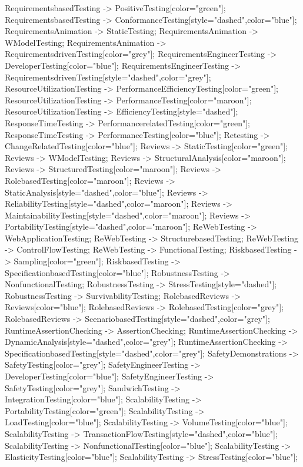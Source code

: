 \documentclass{article}
\begin{document}
{RequirementsbasedTesting -> PositiveTesting[color="green"];
RequirementsbasedTesting -> ConformanceTesting[style="dashed",color="blue"];
RequirementsAnimation -> StaticTesting;
RequirementsAnimation -> WModelTesting;
RequirementsAnimation -> RequirementsdrivenTesting[color="grey"];
RequirementsEngineerTesting -> DeveloperTesting[color="blue"];
RequirementsEngineerTesting -> RequirementsdrivenTesting[style="dashed",color="grey"];
ResourceUtilizationTesting -> PerformanceEfficiencyTesting[color="green"];
ResourceUtilizationTesting -> PerformanceTesting[color="maroon"];
ResourceUtilizationTesting -> EfficiencyTesting[style="dashed"];
ResponseTimeTesting -> PerformancerelatedTesting[color="green"];
ResponseTimeTesting -> PerformanceTesting[color="blue"];
Retesting -> ChangeRelatedTesting[color="blue"];
Reviews -> StaticTesting[color="green"];
Reviews -> WModelTesting;
Reviews -> StructuralAnalysis[color="maroon"];
Reviews -> StructuredTesting[color="maroon"];
Reviews -> RolebasedTesting[color="maroon"];
Reviews -> StaticAnalysis[style="dashed",color="blue"];
Reviews -> ReliabilityTesting[style="dashed",color="maroon"];
Reviews -> MaintainabilityTesting[style="dashed",color="maroon"];
Reviews -> PortabilityTesting[style="dashed",color="maroon"];
ReWebTesting -> WebApplicationTesting;
ReWebTesting -> StructurebasedTesting;
ReWebTesting -> ControlFlowTesting;
ReWebTesting -> FunctionalTesting;
RiskbasedTesting -> Sampling[color="green"];
RiskbasedTesting -> SpecificationbasedTesting[color="blue"];
RobustnessTesting -> NonfunctionalTesting;
RobustnessTesting -> StressTesting[style="dashed"];
RobustnessTesting -> SurvivabilityTesting;
RolebasedReviews -> Reviews[color="blue"];
RolebasedReviews -> RolebasedTesting[color="grey"];
RolebasedReviews -> ScenariobasedTesting[style="dashed",color="grey"];
RuntimeAssertionChecking -> AssertionChecking;
RuntimeAssertionChecking -> DynamicAnalysis[style="dashed",color="grey"];
RuntimeAssertionChecking -> SpecificationbasedTesting[style="dashed",color="grey"];
SafetyDemonstrations -> SafetyTesting[color="grey"];
SafetyEngineerTesting -> DeveloperTesting[color="blue"];
SafetyEngineerTesting -> SafetyTesting[color="grey"];
SandwichTesting -> IntegrationTesting[color="blue"];
ScalabilityTesting -> PortabilityTesting[color="green"];
ScalabilityTesting -> LoadTesting[color="blue"];
ScalabilityTesting -> VolumeTesting[color="blue"];
ScalabilityTesting -> TransactionFlowTesting[style="dashed",color="blue"];
ScalabilityTesting -> NonfunctionalTesting[color="blue"];
ScalabilityTesting -> ElasticityTesting[color="blue"];
ScalabilityTesting -> StressTesting[color="blue"];
}
\end{document}
